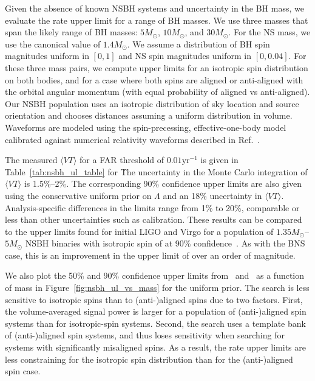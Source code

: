 Given the absence of known \ac{NSBH} systems and uncertainty in the \ac{BH} mass, we evaluate the
rate upper limit for a range of \ac{BH} masses. We use three masses that span the likely
range of \ac{BH} masses: $5M_\odot$, $10M_\odot$, and $30M_\odot$. For the \ac{NS} mass,
we use the canonical value of $1.4M_\odot$. We assume a distribution of \ac{BH} spin magnitudes
uniform in $[0,1]$ and \ac{NS} spin magnitudes uniform in $[0, 0.04]$.
For these three mass pairs, we compute upper limits for an isotropic spin distribution
on both bodies, and for a case where both spins are aligned or anti-aligned with the orbital angular momentum
(with equal probability of aligned vs anti-aligned).
Our NSBH population uses an isotropic distribution of sky location and source orientation and chooses
distances assuming a uniform distribution in volume. Waveforms are modeled
using the spin-precessing, effective-one-body model calibrated against numerical relativity
waveforms described in Ref.~\citep{Taracchini:2013rva,babak2016validating}.

The measured $\langle VT \rangle$ for a FAR threshold of $0.01 \mathrm{yr}^{-1}$ is given in Table~\ref{tab:nsbh_ul_table}
for \pycbc\. The uncertainty in the Monte Carlo integration of $\langle VT \rangle$ is 1.5\%--2\%. The corresponding 
90\% confidence upper limits are also given using the conservative 
uniform prior on $\Lambda$ and an 18\% uncertainty in $\langle VT
\rangle$. Analysis-specific differences in the limits range from 1\% to 20\%,
comparable or less than other uncertainties such as calibration.  
These results can be compared to the upper limits found for initial \ac{LIGO} and Virgo
for a population of $1.35M_\odot$--$5M_\odot$ \ac{NSBH} binaries with isotropic spin of
\SSixNSBHULFiveSpin at 90\% confidence~\citep{Colaboration:2011np}.
As with the \ac{BNS} case, this is an improvement in the upper limit of over an order of magnitude.

We also plot the 50\% and 90\% confidence upper limits from \pycbc\ and \gstlal\ as a function of mass in 
Figure~\ref{fig:nsbh_ul_vs_mass} for the uniform prior. The search is
less sensitive to isotropic spins than to (anti-)aligned spins due to two factors.
First, the volume-averaged signal
power is larger for a population of (anti-)aligned spin systems than for isotropic-spin systems.
Second, the search uses a template bank of (anti-)aligned spin systems, and thus loses sensitivity
when searching for systems with significantly misaligned spins.
As a result, the rate upper limits are less constraining
for the isotropic spin distribution than for the (anti-)aligned spin case.
